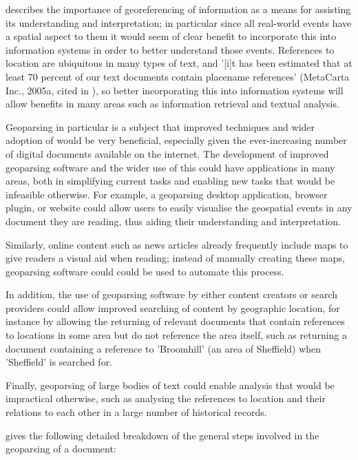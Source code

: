 \documentclass[12pt, a4paper]{report}
\begin{document}
\citet{hill2006} describes the importance of georeferencing of information as a means for assisting its understanding and interpretation; in particular since all real-world events have a spatial aspect to them it would seem of clear benefit to incorporate this into information systems in order to better understand those events. References to location are ubiquitous in many types of text, and '[i]t has been estimated that at least 70 percent of our text documents contain placename references' (MetaCarta Inc., 2005a, cited in \citet[p.~5]{hill2006}), so better incorporating this into information systems will allow benefits in many areas such as information retrieval and textual analysis. 

Geoparsing in particular is a subject that improved techniques and wider adoption of would be very beneficial, especially given the ever-increasing number of digital documents available on the internet. The development of improved geoparsing software and the wider use of this could have applications in many areas, both in simplifying current tasks and enabling new tasks that would be infeasible otherwise. For example, a geoparsing desktop application, browser plugin, or website could allow users to easily visualise the geospatial events in any document they are reading, thus aiding their understanding and interpretation.

Similarly, online content such as news articles already frequently include maps to give readers a visual aid when reading; instead of manually creating these maps, geoparsing software could could be used to automate this process.

In addition, the use of geoparsing software by either content creators or search providers could allow improved searching of content by geographic location, for instance by allowing the returning of relevant documents that contain references to locations in some area but do not reference the area itself, such as returning a document containing a reference to 'Broomhill' (an area of Sheffield) when 'Sheffield' is searched for.

Finally, geoparsing of large bodies of text could enable analysis that would be impractical otherwise, such as analysing the references to location and their relations to each other in a large number of historical records.

\citet{hill2006} gives the following detailed breakdown of the general steps involved in the geoparsing of a document:
\end{document}
